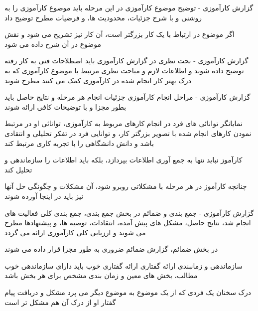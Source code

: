 \documentclass[14pt]{beamer}
\newcommand{\framefontsizelarge}{\fontsize{18pt}{0pt}\selectfont}
\newcommand{\frametitlefontsize}{\fontsize{20pt}{0pt}\selectfont}
\begin{document}
\begin{persian}
	\begin{frame}[plain]{\frametitlefontsize گزارش کارآموزی - توضیح موضوع کارآموزی}
		\framefontsizelarge
		در این مرحله باید موضوع کارآموزی را به روشنی و با شرح جزئیات، محدودیت ها، و فرضیات مطرح توضیح داد
		
		اگر موضوع در ارتباط با یک کار بزرگتر است، آن کار نیز تشریح می شود و نقش موضوع در آن شرح داده می شود
	\end{frame}	
	
	\begin{frame}[plain]{\frametitlefontsize گزارش کارآموزی - بحث نظری}
		\framefontsizelarge
		در گزارش کارآموزی باید اصطلاحات فنی به کار رفته توضیح داده شوند و اطلاعات لازم و مباحث نظری مرتبط با موضوع کارآموزی که به درک بهتر کار انجام شده در کارآموزی کمک می کنند مطرح شوند
	\end{frame}	
	
	\begin{frame}[plain]{\frametitlefontsize گزارش کارآموزی - مراحل انجام کارآموزی}
		\framefontsizelarge
		جزئیات انجام هر مرحله و نتایج حاصل باید بطور مجزا و با توضیحات کافی ارائه شوند
		
		نمایانگر توانائی های فرد در انجام کارهای مربوط به کارآموزی، توانائی او در مرتبط نمودن کارهای انجام شده با تصویر بزرگتر کار، و توانایی فرد در تفکر تحلیلی و انتقادی باشد و دانش دانشگاهی را با تجربه کاری مرتبط کند
		
		کارآموز نباید تنها به جمع آوری اطلاعات بپردازد، بلکه باید اطلاعات را سازماندهی و تحلیل کند
		
		چنانچه کارآموز در هر مرحله با مشکلاتی روبرو شود، آن مشکلات و چگونگی حل آنها نیز باید در اینجا آورده شوند
	\end{frame}	
	
	\begin{frame}[plain]{\frametitlefontsize گزارش کارآموزی - جمع بندی و ضمائم}
		\framefontsizelarge
		در بخش جمع بندی، جمع بندی کلی فعالیت های انجام شد، نتایج حاصل، مشکل های پیش آمده، انتقادات، توصیه ها، و پیشنهادها مطرح می شوند و ارزیابی کلی کارآموزی ارائه می گردد
		
		در بخش ضمائم، گزارش ضمائم ضروری به طور مجزا قرار داده می شوند
	\end{frame}	
	
	\begin{frame}[plain]{\frametitlefontsize سازماندهی و زمانبندی ارائه گفتاری}
		\framefontsizelarge
		ارائه گفتاری خوب باید دارای سازماندهی خوب مطالب، بخش های معین و زمان بندی مشخص برای هر بخش باشد
		
		درک سخنان یک فردی که از یک موضوع به موضوع دیگر می پرد مشکل و دریافت پیام گفتار او از درک آن هم مشکل تر است
		

\end{frame}
\end{persian}
\end{document}
